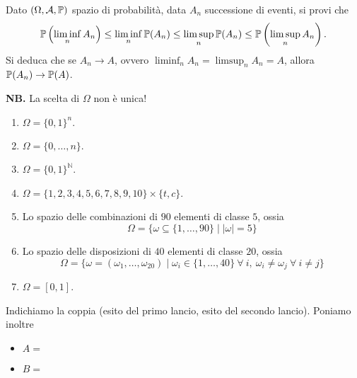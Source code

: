 \Esercizio{$\star$}

Dato $(\Omega ,\mathcal{A} ,\mathbb{P})$ spazio di probabilità, data $A_{n}$ successione di eventi, si provi che
\begin{equation*}
	\mathbb{P}\left(\liminf_{n} A_{n}\right) \leq \liminf_{n}\mathbb{P}(A_{n}) \leq \limsup_{n}\mathbb{P}(A_{n})\leq \mathbb{P}\left(\limsup_{n} A_{n}\right) .
\end{equation*}
Si deduca che se $A_{n}\rightarrow A$, ovvero $\liminf_{n} A_{n} =\limsup_{n} A_{n} =A$, allora $\mathbb{P}(A_{n})\rightarrow \mathbb{P}(A)$.

\ParteSoluzioni

\Soluzione


\textbf{NB.} La scelta di $\Omega $ non è unica!
\begin{enumerate}
	\item $\Omega =\{0,1\}^{n} .$
	\item $\Omega =\{0,\dots ,n\}$.
	\item $\Omega =\{0,1\}^{\mathbb{N}}$.
	\item $\Omega =\{1,2,3,4,5,6,7,8,9,10\} \times \{t,c\}$.
	\item Lo spazio delle combinazioni di $90$ elementi di classe $5$, ossia
	\begin{equation*}
		\Omega =\{\omega \subseteq \{1,\dots ,90\} \mid |\omega |=5\}
	\end{equation*}
	\item Lo spazio delle disposizioni di $40$ elementi di classe $20$, ossia
	\begin{equation*}
		\Omega =\{\omega =(\omega_{1} ,\dots ,\omega_{20}) \mid \omega_{i} \in \{1,\dots ,40\} \ \forall \ i,\ \omega_{i} \neq \omega_{j} \ \forall \ i\neq j\}
	\end{equation*}
	\item $\Omega =[0,1]$.
\end{enumerate}

\Soluzione

Indichiamo la coppia (esito del primo lancio, esito del secondo lancio). Poniamo inoltre
\begin{itemize}
	\item $A=$ 
	\item $B=$ 
\end{itemize}

